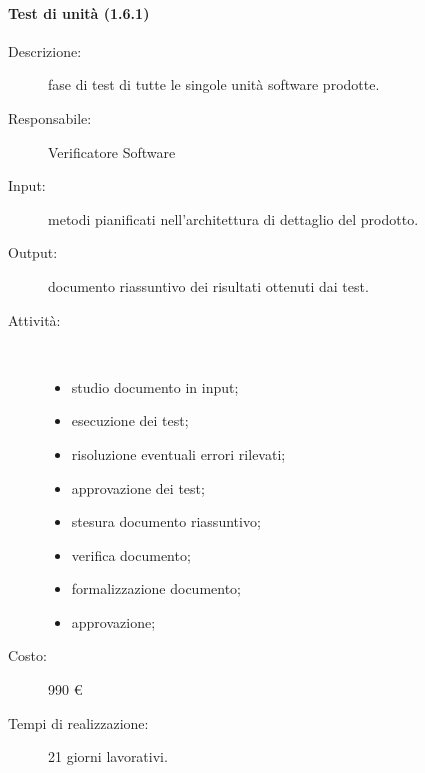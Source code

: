 \paragraph{Test di unit\`{a} (1.6.1)}
\begin{description}
\item[Descrizione:] fase di test di tutte le singole unit\`{a} software prodotte.
\item[Responsabile:] Verificatore Software
\item[Input:] metodi pianificati nell'architettura di dettaglio del prodotto.
\item[Output:] documento riassuntivo dei risultati ottenuti dai test.
\item[Attività:]\mbox{}\\[-1.5\baselineskip]
	\begin{itemize}
	\item studio documento in input;
	\item esecuzione dei test;
	\item risoluzione eventuali errori rilevati;
	\item approvazione dei test;
	\item stesura documento riassuntivo;
	\item verifica documento;
	\item formalizzazione documento;
	\item approvazione;
	\end{itemize}
\item[Costo:] 990 \euro{}
\item[Tempi di realizzazione:] 21 giorni lavorativi.
\end{description}

